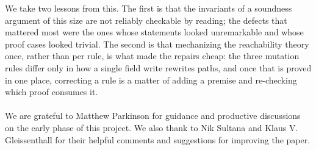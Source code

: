 We take two lessons from this.  The first is that the invariants of a soundness argument of this size are not reliably checkable by reading; the defects that mattered most were the ones whose statements looked unremarkable and whose proof cases looked trivial.  The second is that mechanizing the reachability theory once, rather than per rule, is what made the repairs cheap: the three mutation rules differ only in how a single field write rewrites paths, and once that is proved in one place, correcting a rule is a matter of adding a premise and re-checking which proof consumes it.

\paragraph{}
 We are grateful to Matthew Parkinson for guidance and productive discussions on the early phase of this project. We also thank to Nik Sultana and Klaus V. Gleissenthall for their helpful comments and suggestions for improving the paper. 

